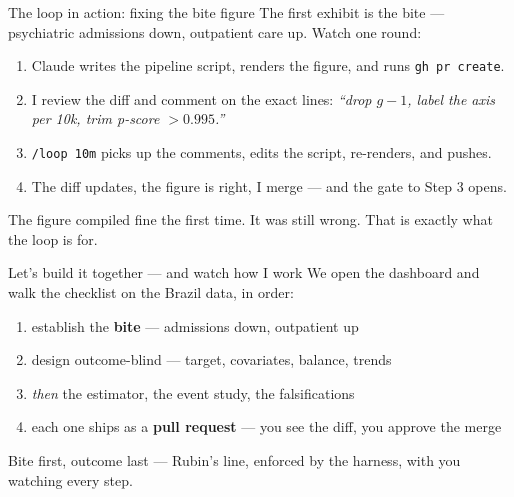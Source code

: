 \documentclass[aspectratio=169,11pt]{beamer}
\begin{document}
\begin{frame}{The loop in action: fixing the bite figure}
The first exhibit is the bite --- psychiatric admissions down, outpatient care up. Watch one round:
\vspace{0.25cm}
\begin{enumerate}\setlength\itemsep{0.22em}
    \item Claude writes the pipeline script, renders the figure, and runs \texttt{gh pr create}.
    \item I review the diff and comment on the exact lines: \emph{``drop $g-1$, label the axis per 10k, trim p-score $>0.995$.''}
    \item \texttt{/loop 10m} picks up the comments, edits the script, re-renders, and pushes.
    \item The diff updates, the figure is right, I merge --- and the gate to Step 3 opens.
\end{enumerate}
\vspace{0.2cm}

\alert{The figure compiled fine the first time. It was still wrong. That is exactly what the loop is for.}
\end{frame}

\begin{frame}{Let's build it together --- and watch how I work}
We open the dashboard and walk the checklist on the Brazil data, in order:
\vspace{0.2cm}
\begin{enumerate}\setlength\itemsep{0.18em}
    \item establish the \textbf{bite} --- admissions down, outpatient up
    \item design outcome-blind --- target, covariates, balance, trends
    \item \emph{then} the estimator, the event study, the falsifications
    \item each one ships as a \textbf{pull request} --- you see the diff, you approve the merge
\end{enumerate}
\vspace{0.25cm}

\alert{Bite first, outcome last --- Rubin's line, enforced by the harness, with you watching every step.}
\end{frame}
\end{document}
